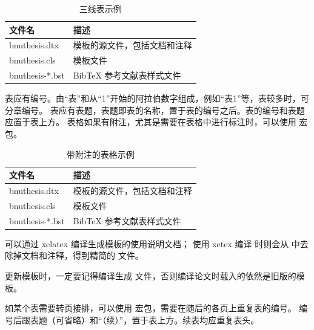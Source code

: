 \begin{table}
  \centering
  \caption{三线表示例}
  \begin{tabular}{ll}
    \toprule
    文件名          & 描述                         \\
    \midrule
    bnuthesis.dtx   & 模板的源文件，包括文档和注释 \\
    bnuthesis.cls   & 模板文件                     \\
    bnuthesis-*.bst & BibTeX 参考文献表样式文件    \\
    \bottomrule
  \end{tabular}
  \label{tab:three-line}
\end{table}


表应有编号。由“表”和从“1”开始的阿拉伯数字组成，例如“表1”等，表较多时，可分章编号。
表应有表题，表题即表的名称，置于表的编号之后。表的编号和表题应置于表上方。
表格如果有附注，尤其是需要在表格中进行标注时，可以使用  宏包。

\begin{table}
  \centering
  \begin{threeparttable}[c]
    \caption{带附注的表格示例}
    \label{tab:three-part-table}
    \begin{tabular}{ll}
      \toprule
      文件名                 & 描述                         \\
      \midrule
      bnuthesis.dtx\tnote{a} & 模板的源文件，包括文档和注释 \\
      bnuthesis.cls\tnote{b} & 模板文件                     \\
      bnuthesis-*.bst        & BibTeX 参考文献表样式文件    \\
      \bottomrule
    \end{tabular}
    \begin{tablenotes}
      \item [a] 可以通过 xelatex 编译生成模板的使用说明文档；
        使用 xetex 编译  时则会从  中去除掉文档和注释，得到精简的  文件。
      \item [b] 更新模板时，一定要记得编译生成  文件，否则编译论文时载入的依然是旧版的模板。
    \end{tablenotes}
  \end{threeparttable}
\end{table}

如某个表需要转页接排，可以使用  宏包，需要在随后的各页上重复表的编号。
编号后跟表题（可省略）和“（续）”，置于表上方。续表均应重复表头。

